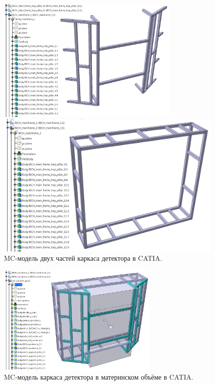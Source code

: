 \begin{figure}[H]
\begin{minipage}[b]{0.495\textwidth}
\includegraphics[width=0.8\textwidth]{pictures/Mainframe_1.png}
\end{minipage}
\hspace{0.01\textwidth}
\begin{minipage}[b]{0.495\textwidth}
\includegraphics[width=1.0\textwidth]{pictures/Mainframe_2.png}
\end{minipage}
\caption{MC-модель двух частей каркаса детектора в CATIA.}
\label{fig:geoMainframe1and2}
\end{figure}

\begin{figure}[H]
\centering
\includegraphics[width=0.7\textwidth]{pictures/Mainframe.png}
\caption{MC-модель каркаса детектора в материнском объёме в CATIA.}
\label{fig:geoMainframe}
\end{figure}

